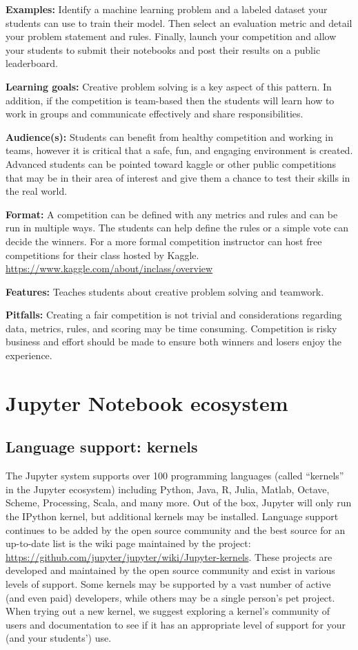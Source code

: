 \documentclass[]{book}
\begin{document}
\textbf{Examples:} Identify a machine learning problem and a labeled
dataset your students can use to train their model. Then select an
evaluation metric and detail your problem statement and rules. Finally,
launch your competition and allow your students to submit their
notebooks and post their results on a public leaderboard.

\textbf{Learning goals:} Creative problem solving is a key aspect of
this pattern. In addition, if the competition is team-based then the
students will learn how to work in groups and communicate effectively
and share responsibilities.

\textbf{Audience(s):} Students can benefit from healthy competition and
working in teams, however it is critical that a safe, fun, and engaging
environment is created. Advanced students can be pointed toward kaggle
or other public competitions that may be in their area of interest and
give them a chance to test their skills in the real world.

\textbf{Format:} A competition can be defined with any metrics and rules
and can be run in multiple ways. The students can help define the rules
or a simple vote can decide the winners. For a more formal competition
instructor can host free competitions for their class hosted by Kaggle.
\url{https://www.kaggle.com/about/inclass/overview}

\textbf{Features:} Teaches students about creative problem solving and
teamwork.

\textbf{Pitfalls:} Creating a fair competition is not trivial and
considerations regarding data, metrics, rules, and scoring may be time
consuming. Competition is risky business and effort should be made to
ensure both winners and losers enjoy the experience.

\hypertarget{jupyter}{\chapter{Jupyter Notebook
ecosystem}\label{jupyter}}

\section{Language support: kernels}\label{language-support-kernels}

The Jupyter system supports over 100 programming languages (called
``kernels'' in the Jupyter ecosystem) including Python, Java, R, Julia,
Matlab, Octave, Scheme, Processing, Scala, and many more. Out of the
box, Jupyter will only run the IPython kernel, but additional kernels
may be installed. Language support continues to be added by the open
source community and the best source for an up-to-date list is the wiki
page maintained by the project:
\url{https://github.com/jupyter/jupyter/wiki/Jupyter-kernels}. These
projects are developed and maintained by the open source community and
exist in various levels of support. Some kernels may be supported by a
vast number of active (and even paid) developers, while others may be a
single person's pet project. When trying out a new kernel, we suggest
exploring a kernel's community of users and documentation to see if it
has an appropriate level of support for your (and your students') use.
\end{document}

